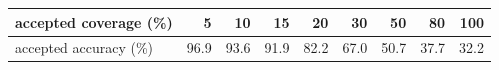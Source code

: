 {\setlength{\tabcolsep}{4.5pt}\begin{tabular}{lrrrrrrrr}\toprule
accepted coverage (\%) & 5 & 10 & 15 & 20 & 30 & 50 & 80 & 100 \\\midrule
accepted accuracy (\%) & 96.9 & 93.6 & 91.9 & 82.2 & 67.0 & 50.7 & 37.7 & 32.2 \\
\bottomrule\end{tabular}}
